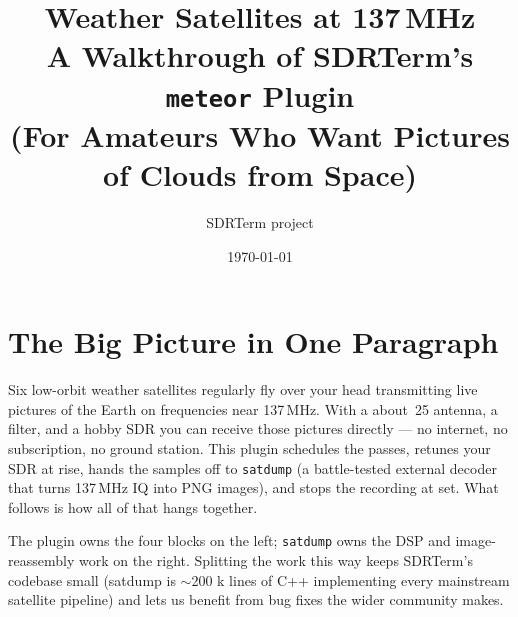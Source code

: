 \documentclass[11pt,a4paper]{article}
\title{Weather Satellites at 137\,MHz\\
       \large A Walkthrough of SDRTerm's \texttt{meteor} Plugin\\
       (For Amateurs Who Want Pictures of Clouds from Space)}
\author{SDRTerm project}
\date{\today}
\newcommand{\EUR}[1]{\officialeuro\,#1}
\begin{document}
\maketitle
\tableofcontents
\vspace{2em}

\section{The Big Picture in One Paragraph}

Six low-orbit weather satellites regularly fly over your head
transmitting live pictures of the Earth on frequencies near 137\,MHz.
With a about \EUR{25} antenna, a filter, and a hobby SDR you can
receive those pictures directly — no internet, no subscription, no
ground station.  This plugin schedules the passes, retunes your SDR
at rise, hands the samples off to \texttt{satdump} (a battle-tested
external decoder that turns 137\,MHz IQ into PNG images), and stops
the recording at set.  What follows is how all of that hangs together.

\begin{center}
\end{center}

The plugin owns the four blocks on the left; \texttt{satdump} owns the
DSP and image-reassembly work on the right.  Splitting the work this
way keeps SDRTerm's codebase small (satdump is $\sim$200 k lines of
C++ implementing every mainstream satellite pipeline) and lets us
benefit from bug fixes the wider community makes.
\end{document}
